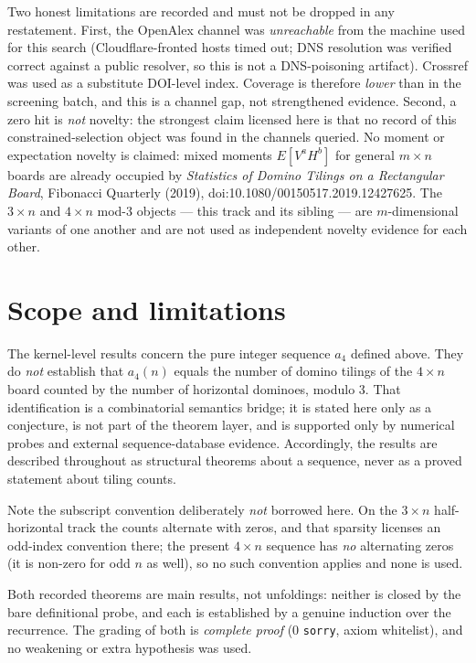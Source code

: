 \documentclass[11pt]{article}
\begin{document}
Two honest limitations are recorded and must not be dropped in any restatement.
First, the OpenAlex channel was \emph{unreachable} from the machine used for this search
(Cloudflare-fronted hosts timed out; DNS resolution was verified correct against a public
resolver, so this is not a DNS-poisoning artifact). Crossref was used as a substitute
DOI-level index. Coverage is therefore \emph{lower} than in the screening batch, and this is
a channel gap, not strengthened evidence.
Second, a zero hit is \emph{not} novelty: the strongest claim licensed here is that no
record of this constrained-selection object was found in the channels queried.
No moment or expectation novelty is claimed: mixed moments $E[V^a H^b]$ for general $m\times n$
boards are already occupied by \emph{Statistics of Domino Tilings on a Rectangular Board},
Fibonacci Quarterly (2019), doi:10.1080/00150517.2019.12427625.
The $3\times n$ and $4\times n$ mod-3 objects --- this track and its sibling --- are
$m$-dimensional variants of one another and are not used as independent novelty evidence for
each other.

\section{Scope and limitations}
The kernel-level results concern the pure integer sequence $a_4$ defined above. They do
\emph{not} establish that $a_4(n)$ equals the number of domino tilings of the $4\times n$
board counted by the number of horizontal dominoes, modulo 3. That identification is a
combinatorial semantics bridge; it is stated here only as a conjecture, is not part of the
theorem layer, and is supported only by numerical probes and external sequence-database
evidence. Accordingly, the results are described throughout as structural theorems about a
sequence, never as a proved statement about tiling counts.

Note the subscript convention deliberately \emph{not} borrowed here. On the $3\times n$
half-horizontal track the counts alternate with zeros, and that sparsity licenses an
odd-index convention there; the present $4\times n$ sequence has \emph{no} alternating zeros
(it is non-zero for odd $n$ as well), so no such convention applies and none is used.

Both recorded theorems are main results, not unfoldings: neither is closed by the bare
definitional probe, and each is established by a genuine induction over the recurrence. The
grading of both is \emph{complete proof} (0 \texttt{sorry}, axiom whitelist), and no weakening
or extra hypothesis was used.
\end{document}
